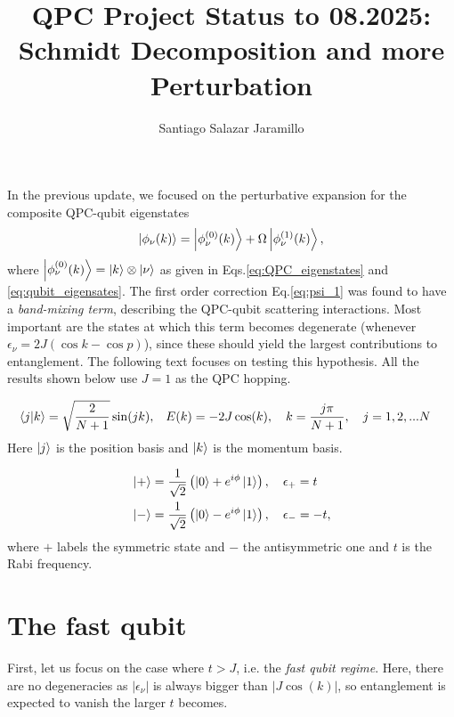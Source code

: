 \documentclass{article}
\title{QPC Project Status to 08.2025: Schmidt Decomposition and more Perturbation}
\author{Santiago Salazar Jaramillo}
\date{}
\begin{document}
\maketitle

In the previous update, we focused on the perturbative expansion for the composite QPC-qubit eigenstates 
\begin{align}
    \ket{\phi_\nu (k)} = \ket{\phi_\nu^{(0)} (k)} + \Omega \ket{\phi_\nu^{(1)} (k) },
\end{align}
where $\ket{\phi_\nu^{(0)} (k)} = \ket{k}\otimes\ket{\nu}$ as given in Eqs.\eqref{eq:QPC_eigenstates}  and \eqref{eq:qubit_eigensates}. The first order correction Eq.\eqref{eq:psi_1} was found to have a \textit{band-mixing term},
 describing the QPC-qubit scattering interactions. Most important are the states at which this term becomes degenerate (whenever $\epsilon_\nu = 2J(\cos k -\cos p)$), since these should yield the largest contributions to entanglement. The following text focuses on testing this hypothesis. All the results shown below use $J=1$ as the QPC hopping.


 \begin{tcolorbox}[title=QPC eigenstates, colback=white, colframe=black]
\begin{align}\label{eq:QPC_eigenstates}
    \bra{j}\ket{k} = \sqrt{\frac{2}{N+1}} \sin(j k) ,\quad & E(k) = -2J\cos(k), \quad k = \frac{j\pi}{N+1},\quad j= 1, 2,...N
\end{align}
Here $\ket{j}$ is the position basis and $\ket{k}$ is the momentum basis.
\end{tcolorbox}

\begin{tcolorbox}[title=Qubit eigenstates, colback=white, colframe=black]
\begin{align}\label{eq:qubit_eigensates}
   & \ket{+} = \frac{1}{\sqrt{2}}\left( \ket{0} + e^{i\phi} \ket{1}\right), \quad \epsilon_+ = t \nonumber \\
   & \ket{-} = \frac{1}{\sqrt{2}}\left( \ket{0} - e^{i\phi} \ket{1}\right), \quad \epsilon_- = -t, 
\end{align}
where $+$ labels the symmetric state and $-$ the antisymmetric one and $t$ is the Rabi frequency.
\end{tcolorbox}

\section{The fast qubit}

 First, let us focus on the case where $t>J$, i.e. the \textit{fast qubit regime}. Here, there are no degeneracies as $|\epsilon_\nu|$ is always bigger than $|J \cos(k)|$, so entanglement is expected to vanish the larger $t$ becomes. 
\end{document}
